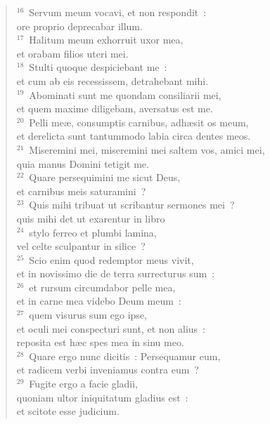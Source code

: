 \begin{flushleft}
\begin{verse}
${}^{16}$~Servum meum vocavi, et non respondit~:\\ ore proprio deprecabar illum.\\
${}^{17}$~Halitum meum exhorruit uxor mea,\\ et orabam filios uteri mei.\\
${}^{18}$~Stulti quoque despiciebant me~:\\ et cum ab eis recessissem, detrahebant mihi.\\
${}^{19}$~Abominati sunt me quondam consiliarii mei,\\ et quem maxime diligebam, aversatus est me.\\
${}^{20}$~Pelli me\ae , consumptis carnibus, adh\ae sit os meum,\\ et derelicta sunt tantummodo labia circa dentes meos.\\
${}^{21}$~Miseremini mei, miseremini mei saltem vos, amici mei,\\ quia manus Domini tetigit me.\\
${}^{22}$~Quare persequimini me sicut Deus,\\ et carnibus meis saturamini~?\\
${}^{23}$~Quis mihi tribuat ut scribantur sermones mei~?\\ quis mihi det ut exarentur in libro\\
${}^{24}$~stylo ferreo et plumbi lamina,\\ vel celte sculpantur in silice~?\\
${}^{25}$~Scio enim quod redemptor meus vivit,\\ et in novissimo die de terra surrecturus sum~:\\
${}^{26}$~et rursum circumdabor pelle mea,\\ et in carne mea videbo Deum meum~:\\
${}^{27}$~quem visurus sum ego ipse,\\ et oculi mei conspecturi sunt, et non alius~:\\ reposita est h\ae c spes mea in sinu meo.\\
${}^{28}$~Quare ergo nunc dicitis~: Persequamur eum,\\ et radicem verbi inveniamus contra eum~?\\
${}^{29}$~Fugite ergo a facie gladii,\\ quoniam ultor iniquitatum gladius est~:\\ et scitote esse judicium.\end{verse}\end{flushleft}


